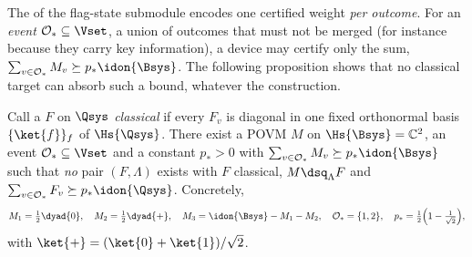 
The  of the flag-state submodule encodes
one certified weight \emph{per outcome}. For an \emph{event}
$\mathcal{O}_{*}\subseteq\Vset$, a union of outcomes that must not be merged
(for instance because they carry key information), a device may certify only
the sum, $\sum_{v\in\mathcal{O}_{*}}M_v\succeq p_{*}\idon{\Bsys}$. The
following proposition shows that no classical target can absorb such a
bound, whatever the construction.

\begin{proposition}
\label{prop:obstruction}
Call a  $F$ on $\Qsys$ \emph{classical} if every $F_v$ is diagonal
in one fixed orthonormal basis $\{\ket{f}\}_f$ of $\Hs{\Qsys}$. There exist a
POVM $M$ on $\Hs{\Bsys}=\mathbb{C}^{2}$, an event
$\mathcal{O}_{*}\subseteq\Vset$ and a constant $p_{*}>0$ with
$\sum_{v\in\mathcal{O}_{*}}M_v\succeq p_{*}\idon{\Bsys}$ such that \emph{no}
pair $(F,\Lambda)$ exists with $F$ classical, $M\dsq_{\Lambda}F$ and
$\sum_{v\in\mathcal{O}_{*}}F_v\succeq p_{*}\idon{\Qsys}$. Concretely,
\begin{equation}\label{eq:obstruction}
  M_1=\tfrac12\dyad{0},\quad
  M_2=\tfrac12\dyad{+},\quad
  M_3=\idon{\Bsys}-M_1-M_2,\quad
  \mathcal{O}_{*}=\{1,2\},\quad
  p_{*}=\tfrac12\Big(1-\tfrac{1}{\sqrt2}\Big),
\end{equation}
with $\ket{+}=(\ket{0}+\ket{1})/\sqrt2$.
\end{proposition}

